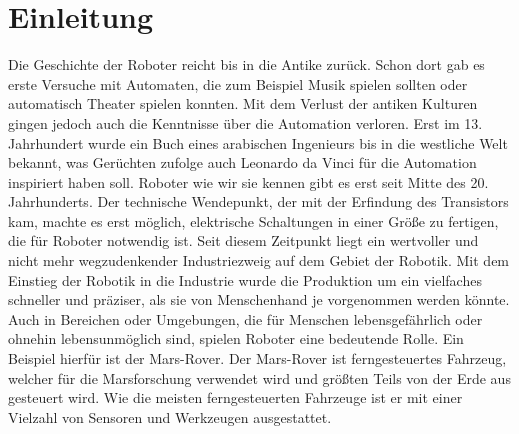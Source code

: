 \chapter{Einleitung}
\label{ch:einleitung}

Die Geschichte der Roboter reicht bis in die Antike zurück. Schon dort gab es erste Versuche mit Automaten, die zum Beispiel Musik spielen sollten oder automatisch Theater spielen konnten. Mit dem Verlust der antiken Kulturen gingen jedoch auch die Kenntnisse über die Automation verloren. Erst im 13. Jahrhundert wurde ein Buch eines arabischen Ingenieurs bis in die westliche Welt bekannt, was Gerüchten zufolge auch Leonardo da Vinci für die Automation inspiriert haben soll. 
Roboter wie wir sie kennen gibt es erst seit Mitte des 20. Jahrhunderts. Der technische Wendepunkt, der mit der Erfindung des Transistors kam, machte es erst möglich, elektrische Schaltungen in einer Größe zu fertigen, die für Roboter notwendig ist. Seit diesem Zeitpunkt liegt ein wertvoller und nicht mehr wegzudenkender Industriezweig auf dem Gebiet der Robotik. Mit dem Einstieg der Robotik in die Industrie wurde die Produktion um ein vielfaches schneller und präziser, als sie von Menschenhand je vorgenommen werden könnte. Auch in Bereichen oder Umgebungen, die für Menschen lebensgefährlich oder ohnehin lebensunmöglich sind, spielen Roboter eine bedeutende Rolle. Ein Beispiel hierfür ist der Mars-Rover. Der Mars-Rover ist ferngesteuertes Fahrzeug, welcher für die Marsforschung verwendet wird und größten Teils von der Erde aus gesteuert wird. Wie die meisten ferngesteuerten Fahrzeuge ist er mit einer Vielzahl von Sensoren und Werkzeugen ausgestattet. 

